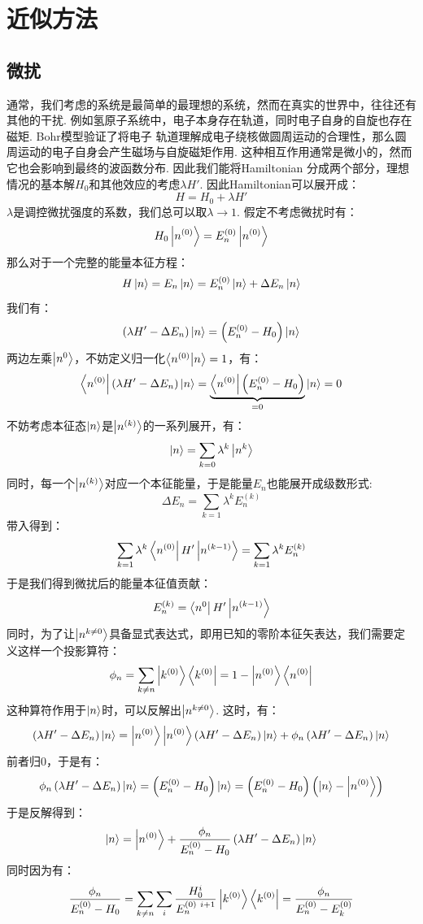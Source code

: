 \chapter{近似方法}
\section{微扰}
通常，我们考虑的系统是最简单的最理想的系统，然而在真实的世界中，往往还有其他的干扰. 例如氢原子系统中，电子本身存在轨道，同时电子自身的自旋也存在磁矩. Bohr模型验证了将电子
轨道理解成电子绕核做圆周运动的合理性，那么圆周运动的电子自身会产生磁场与自旋磁矩作用. 这种相互作用通常是微小的，然而它也会影响到最终的波函数分布. 因此我们能将Hamiltonian
分成两个部分，理想情况的基本解\(H_{0}\)和其他效应的考虑\(\lambda H'\). 因此Hamiltonian可以展开成：
\[
H = H_{0} + \lambda H'
\]
\(\lambda\)是调控微扰强度的系数，我们总可以取\(\lambda\to1\). 假定不考虑微扰时有：
\[
H_{0}\ket{n^{(0)}} = E_{n}^{(0)}\ket{n^{(0)}}
\]
那么对于一个完整的能量本征方程：
\[
H\ket{n} = E_{n}\ket{n} = E_{n}^{(0)}\ket{n} + \Delta E_{n}\ket{n}
\]
我们有：
\[
\left({\lambda H' - \Delta E_{n}}\right)\ket{n} = \left({E_{n}^{(0)} - H_{0}}\right)\ket{n}
\]
两边左乘\(\ket{n^{0}}\)，不妨定义归一化\(\bra{n^{(0)}}\ket{n} = 1\)，有：
\[
\bra{n^{(0)}}\left({\lambda H' - \Delta E_{n}}\right)\ket{n} = \underbrace{\bra{n^{(0)}}\left({E_{n}^{(0)} - H_{0}}\right)}_{=0}\ket{n} = 0
\]
不妨考虑本征态\(\ket{n}\)是\(\ket{n^{(k)}}\)的一系列展开，有：
\[
\ket{n} = \sum_{k=0}\lambda^{k}\ket{n^{k}}
\]
同时，每一个\(\ket{n^{(k)}}\)对应一个本征能量，于是能量\(E_{n}\)也能展开成级数形式:
\[
\Delta E_{n} = \sum_{k=1}\lambda^{k} E^{(k)}_{n}
\]
带入得到：
\[
\sum_{k=1}\lambda^{k}\bra{n^{(0)}}H'\ket{n^{(k-1)}} = \sum_{k=1}\lambda^{k}E^{(k)}_{n}
\]
于是我们得到微扰后的能量本征值贡献：
\[
E^{(k)}_{n} = \bra{n^{0}}H'\ket{n^{(k-1)}}
\]
同时，为了让\(\ket{n^{k\neq0}}\)具备显式表达式，即用已知的零阶本征矢表达，我们需要定义这样一个投影算符：
\[
\phi_{n} = \sum_{k\neq n}\ket{k^{(0)}}\bra{k^{(0)}} = 1 - \ket{n^{(0)}}\bra{n^{(0)}}
\]
这种算符作用于\(\ket{n}\)时，可以反解出\(\ket{n^{k\neq0}}\). 这时，有：
\[
\left({\lambda H' - \Delta E_{n}}\right)\ket{n} = \ket{n^{(0)}}\ket{n^{(0)}}\left({\lambda H' - \Delta E_{n}}\right)\ket{n} + \phi_{n}\left({\lambda H' - \Delta E_{n}}\right)\ket{n} 
\]
前者归0，于是有：
\[
\phi_{n}\left({\lambda H' - \Delta E_{n}}\right)\ket{n} = \left({E_{n}^{(0)} - H_{0}}\right)\ket{n} = \left({E_{n}^{(0)} - H_{0}}\right)\left({\ket{n}-\ket{n^{(0)}}}\right)
\]
于是反解得到：
\[
\ket{n} = \ket{n^{(0)}} + \frac{\phi_{n}}{E_{n}^{(0)}-H_{0}}\left({\lambda H' - \Delta E_{n}}\right)\ket{n}
\]
同时因为有：
\[
\frac{\phi_{n}}{E_{n}^{(0)}-H_{0}} = \sum_{k\neq n}\sum_{i}\frac{H_{0}^{i}}{E_{n}^{(0)\ i+1}}\ket{k^{(0)}}\bra{k^{(0)}} = \frac{\phi_{n}}{E_{n}^{(0)}-E_{k}^{(0)}}
\]
